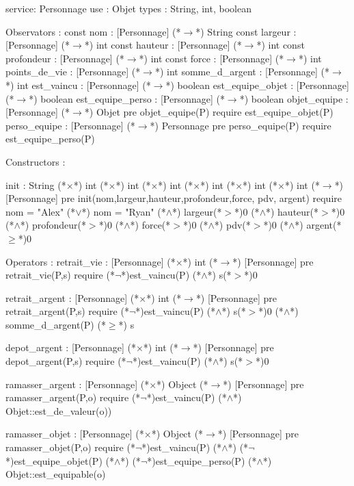\documentclass[a4paper, 11pt]{report}
\begin{document}
\begin{Spe}
service: Personnage
use : Objet
types : String, int, boolean

Observators : 
	const nom : [Personnage] (*$\rightarrow$*) String
	const largeur : [Personnage] (*$\rightarrow$*) int
	const hauteur : [Personnage] (*$\rightarrow$*) int
	const profondeur : [Personnage] (*$\rightarrow$*) int
	const force : [Personnage] (*$\rightarrow$*) int 
	points_de_vie : [Personnage] (*$\rightarrow$*) int
	somme_d_argent : [Personnage] (*$\rightarrow$*) int 
	est_vaincu : [Personnage] (*$\rightarrow$*) boolean 
	est_equipe_objet : [Personnage] (*$\rightarrow$*) boolean
	est_equipe_perso : [Personnage] (*$\rightarrow$*) boolean 
	objet_equipe : [Personnage] (*$\rightarrow$*) Objet
		pre objet_equipe(P) require est_equipe_objet(P)
	perso_equipe : [Personnage] (*$\rightarrow$*) Personnage
		pre perso_equipe(P) require est_equipe_perso(P) 

Constructors : 

	init : String (*$\times$*) int (*$\times$*) int (*$\times$*) int (*$\times$*) int (*$\times$*) int (*$\times$*) int (*$\rightarrow$*) [Personnage]
		pre init(nom,largeur,hauteur,profondeur,force, pdv, argent) require nom = "Alex" (*$\lor$*) nom = "Ryan" (*$\land$*) largeur(*$>$*)0 (*$\land$*) hauteur(*$>$*)0 (*$\land$*) profondeur(*$>$*)0 (*$\land$*) force(*$>$*)0 (*$\land$*) pdv(*$>$*)0 (*$\land$*) argent(*$\ge$*)0 

Operators :
	retrait_vie :  [Personnage] (*$\times$*) int (*$\rightarrow$*) [Personnage]
		pre retrait_vie(P,s) require (*$\lnot$*)est_vaincu(P) (*$\land$*) s(*$>$*)0

	retrait_argent :  [Personnage] (*$\times$*) int (*$\rightarrow$*) [Personnage]
		pre retrait_argent(P,s) require (*$\lnot$*)est_vaincu(P) (*$\land$*) s(*$>$*)0 (*$\land$*) somme_d_argent(P) (*$\ge$*) s 
		
	depot_argent : [Personnage] (*$\times$*) int (*$\rightarrow$*) [Personnage]
		pre depot_argent(P,s) require (*$\lnot$*)est_vaincu(P) (*$\land$*) s(*$>$*)0

	ramasser_argent : [Personnage] (*$\times$*) Object (*$\rightarrow$*) [Personnage]
		pre ramasser_argent(P,o) require (*$\lnot$*)est_vaincu(P) (*$\land$*) Objet::est_de_valeur(o))	

	ramasser_objet : [Personnage] (*$\times$*) Object (*$\rightarrow$*) [Personnage]
		pre ramasser_objet(P,o) require (*$\lnot$*)est_vaincu(P) (*$\land$*) (*$\lnot$*)est_equipe_objet(P) (*$\land$*)  (*$\lnot$*)est_equipe_perso(P) (*$\land$*) Objet::est_equipable(o)
		

\end{Spe}
\end{document}
